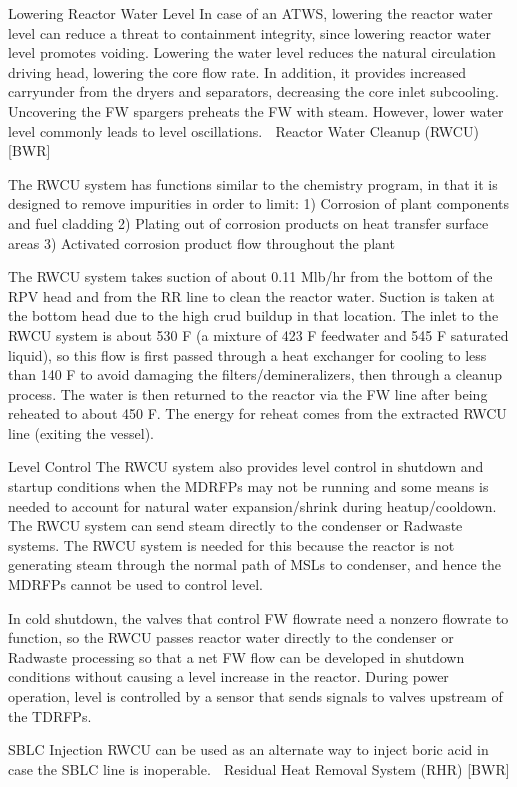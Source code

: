 \documentclass[10pt]{article}
\begin{document}
Lowering Reactor Water Level
In case of an ATWS, lowering the reactor water level can reduce a threat to containment integrity, since lowering reactor water level promotes voiding. Lowering the water level reduces the natural circulation driving head, lowering the core flow rate. In addition, it provides increased carryunder from the dryers and separators, decreasing the core inlet subcooling. Uncovering the FW spargers preheats the FW with steam. However, lower water level commonly leads to level oscillations. 
Reactor Water Cleanup (RWCU) [BWR]

The RWCU system has functions similar to the chemistry program, in that it is designed to remove impurities in order to limit:
1)	Corrosion of plant components and fuel cladding
2)	Plating out of corrosion products on heat transfer surface areas
3)	Activated corrosion product flow throughout the plant

The RWCU system takes suction of about 0.11 Mlb/hr from the bottom of the RPV head and from the RR line to clean the reactor water. Suction is taken at the bottom head due to the high crud buildup in that location. The inlet to the RWCU system is about 530 F (a mixture of 423 F feedwater and 545 F saturated liquid), so this flow is first passed through a heat exchanger for cooling to less than 140 F to avoid damaging the filters/demineralizers, then through a cleanup process. The water is then returned to the reactor via the FW line after being reheated to about 450 F. The energy for reheat comes from the extracted RWCU line (exiting the vessel). 

Level Control
The RWCU system also provides level control in shutdown and startup conditions when the MDRFPs may not be running and some means is needed to account for natural water expansion/shrink during heatup/cooldown. The RWCU system can send steam directly to the condenser or Radwaste systems. The RWCU system is needed for this because the reactor is not generating steam through the normal path of MSLs to condenser, and hence the MDRFPs cannot be used to control level. 

In cold shutdown, the valves that control FW flowrate need a nonzero flowrate to function, so the RWCU passes reactor water directly to the condenser or Radwaste processing so that a net FW flow can be developed in shutdown conditions without causing a level increase in the reactor. During power operation, level is controlled by a sensor that sends signals to valves upstream of the TDRFPs. 

SBLC Injection
RWCU can be used as an alternate way to inject boric acid in case the SBLC line is inoperable. 

Residual Heat Removal System (RHR) [BWR]
\end{document}
